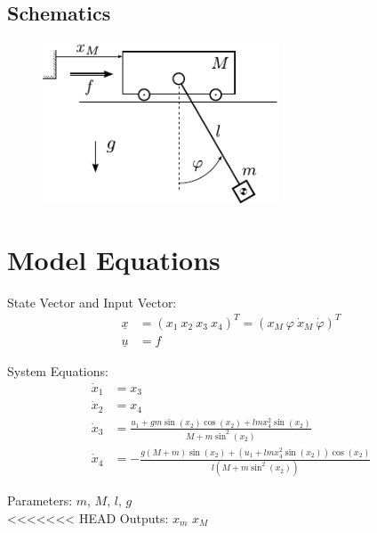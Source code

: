 \documentclass[10pt,a4paper]{article}
\begin{document}
	\begin{tabular}{ll}

	\end{tabular}


	\subsection{Schematics}
	\begin{figure}[H]
		\includegraphics[width=70mm]{sketch.pdf}
	\end{figure}


	\section{Model Equations} %

	State Vector and Input Vector:
	\begin{align*}
		\underline{x} &= (x_1 \ x_2 \ x_3 \ x_4)^T = (x_M\ \varphi\ \dot{x}_M \ \dot{\varphi})^T\\
		\underline{u} &= f
	\end{align*}

	\noindent System Equations:
	\begin{subequations}
	\begin{align}
		\dot{x}_1 &= x_3 \\
		\dot{x}_2 &= x_4 \\
		\dot{x}_3 &=   \frac{u_1 + gm\sin(x_2)\cos(x_2) + lmx_4^2\sin(x_2)}{M + m\sin^2(x_2)} \\
		\dot{x}_4 &= - \frac{g(M + m)\sin(x_2) + (u_1 + lmx_4^2\sin(x_2))\cos(x_2)}{l(M + m\sin^2(x_2))}
	\end{align}
	\end{subequations}

	\noindent
	Parameters: $m, \, M, \, l, \,g$ %
	\\
<<<<<<< HEAD
	Outputs: $x_m$ $x_M$ %
\end{document}
